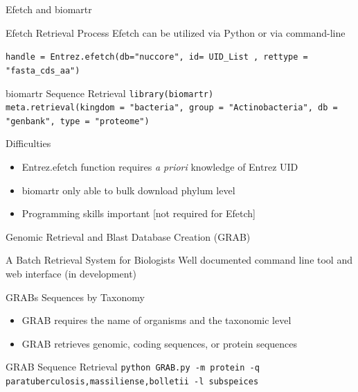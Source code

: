 \documentclass[11pt]{beamer}
\begin{document}
	
	
	\begin{frame}{Efetch and biomartr}
	
	\begin{block}{Efetch Retrieval Process}
	Efetch can be utilized via Python or via command-line
	
	\texttt{handle = Entrez.efetch(db="nuccore", id= \alert{UID\_List} , rettype = "fasta\_cds\_aa")}
	
	\end{block}
	
	\begin{block}{biomartr Sequence Retrieval}
	\texttt{library(biomartr) \\
	meta.retrieval(kingdom = "bacteria", \alert{group = "Actinobacteria"}, db = "genbank", type = "proteome")}
	\end{block}
	
	\begin{block}{Difficulties}
	\begin{itemize}
	\item Entrez.efetch function requires \textit{a priori} knowledge of Entrez UID 
	\item biomartr only able to bulk download phylum level
	\item Programming skills important [not required for Efetch]
	\end{itemize}
	\end{block}
	
	\end{frame}
	
	
	\begin{frame}{Genomic Retrieval and Blast Database Creation (GRAB)}
	\begin{block}{A Batch Retrieval System for Biologists}
	Well documented command line tool and web interface (in development)
	\end{block}
	
	\begin{block}{GRABs Sequences by Taxonomy}
	\begin{itemize}
	\item GRAB requires the name of organisms and the taxonomic level 
	\item GRAB retrieves genomic, coding sequences, or protein sequences
	\end{itemize}
	\end{block}
	
	\begin{block}{GRAB Sequence Retrieval}
	\texttt{python GRAB.py -m protein -q paratuberculosis,massiliense,bolletii -l subspeices}
	\end{block}
	\end{frame}
	
\end{document}
